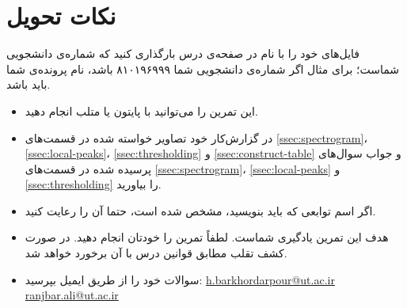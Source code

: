 \documentclass{utsignal}
\begin{document}
	\section*{نکات تحویل}
	فایل‌های خود را با نام  در صفحه‌ی  درس بارگذاری کنید که  شماره‌ی دانشجویی شماست؛ برای مثال اگر شماره‌ی دانشجویی شما ۸۱۰۱۹۶۹۹۹ باشد، نام پرونده‌ی شما باید  باشد.
	\begin{itemize}
		\item این تمرین را می‌توانید با پایتون یا متلب انجام دهید.
		\item در گزارش‌کار خود تصاویر خواسته شده در قسمت‌های \ref{ssec:spectrogram}، \ref{ssec:local-peaks}، \ref{ssec:thresholding} و \ref{ssec:construct-table} و جواب سوال‌های پرسیده شده در قسمت‌های \ref{ssec:spectrogram}، \ref{ssec:local-peaks} و \ref{ssec:thresholding} را بیاورید.
		\item اگر اسم توابعی که باید بنویسید، مشخص شده است، حتما آن را رعایت کنید.
		\item هدف این تمرین یادگیری شماست. لطفاً تمرین را خودتان انجام دهید. در صورت کشف تقلب مطابق قوانین درس با آن برخورد خواهد شد.
		\item سوالات خود را از طریق ایمیل بپرسید:
		\subitem \href{mailto:h.barkhordarpour@ut.ac.ir?subject=[SS\%20S98 P1]}{h.barkhordarpour@ut.ac.ir}
		\subitem \href{mailto:ranjbar.ali@ut.ac.ir?subject=[SS\%20S98 P1]}{ranjbar.ali@ut.ac.ir}
	\end{itemize}
\end{document}
